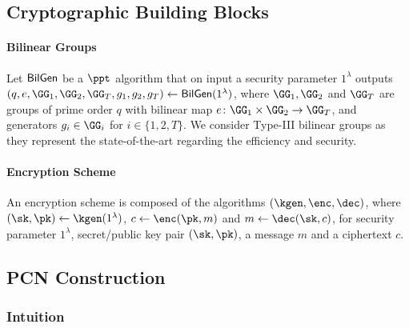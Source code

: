 
\subsection{Cryptographic Building Blocks}

\paragraph{Bilinear Groups} Let $\mathsf{BilGen}$ be a $\ppt$ algorithm that on input a security 
parameter $1^\lambda$ outputs $(q, e, \GG_1, \GG_2, \GG_T, g_1, g_2, g_T) \gets 
\BilGen(1^\lambda)$, where $\GG_1, \GG_2$ and $\GG_T$ are groups of prime order $q$ with 
bilinear map $e \colon \GG_1 \times \GG_2 \to \GG_T$, and generators $g_i \in \GG_i$ for $i \in 
\{1,2,T\}$. We consider Type-III bilinear groups as they represent the state-of-the-art regarding 
the efficiency and security.

\paragraph{Encryption Scheme} An encryption scheme is composed of the algorithms 
$(\kgen,\enc,\dec)$, where $(\sk,\pk) \gets \kgen(1^\lambda)$, $c \gets \enc(\pk,m)$ and 
$m \gets \dec(\sk,c)$, for security parameter $1^\lambda$, secret/public key pair $(\sk,\pk)$, 
a message $m$ and a ciphertext $c$.

\subsection{PCN Construction}

\subsubsection{Intuition}

